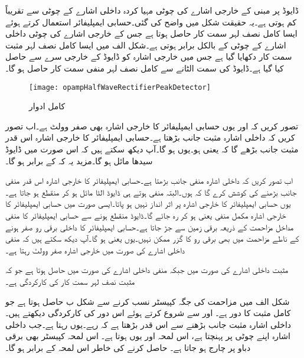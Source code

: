 ڈایوڈ پر مبنی  کے خارجی اشارے کی چوٹی مہیا کردہ داخلی اشارے کے چوٹی سے تقریباً  کم ہوتی ہے۔یہ حقیقت شکل  میں واضح کی گئی۔حسابی ایمپلیفائر استعمال کرتے ہوئے ایسا کامل نصف لہر سمت کار حاصل ہوتا ہے  جس کے خارجی اشارے کی چوٹی داخلی اشارے کے چوٹی کے بالکل برابر ہوتی ہے۔شکل الف میں ایسا کامل نصف لہر مثبت سمت کار دکھایا گیا ہے جس میں خارجی اشارہ  کو ڈایوڈ کے خارجی سرے سے حاصل کیا گیا ہے۔ڈایوڈ کی سمت الٹانے سے  کامل نصف لہر منفی سمت کار حاصل ہو گا۔
\begin{figure}
\centering
\texttt{[image: opampHalfWaveRectifierPeakDetector]}
\caption{کامل ادوار}
\label{شکل_کامل_نصف_لہر_سمت_کار}
\end{figure}

تصور کریں کہ  اور یوں حسابی ایمپلیفائر کا خارجی اشارہ  بھی صفر وولٹ ہے۔اب تصور کریں کہ داخلی اشارہ مثبت جانب بڑھتا ہے۔حسابی ایمپلیفائر کا خارجی اشارہ اس قدر مثبت جانب بڑھے گا کہ  یعنی  ہو۔یوں  ہو گا۔آپ دیکھ سکتے ہیں کہ اس صورت میں ڈایوڈ سیدھا مائل ہو گا۔مزید یہ کہ  کے برابر ہو گا۔

اب تصور کریں کہ داخلی اشارہ منفی جانب بڑھتا ہے۔حسابی ایمپلیفائر کا خارجی اشارہ  اس قدر منفی جانب بڑھنے کی کوشش کرے گا کہ  ہوں۔البتہ  منفی ہوتے ہی ڈایوڈ الٹا مائل ہو کر منقطع ہو جاتا ہے۔یوں حسابی ایمپلیفائر کا خارجی اشارہ  پر اثر انداز نہیں ہو پاتا۔ایسی صورت میں حسابی ایمپلیفائر کا خارجی اشارہ مکمل منفی یعنی  ہو کر رہ جائے گا۔ڈایوڈ منقطع ہونے سے  حسابی ایمپلیفائر کا منفی مداخل مزاحمت  کے ذریعہ برقی زمین سے جڑ جاتا ہے۔حسابی ایمپلیفائر کا داخلی برقی رو صفر ہونے کے ناطے مزاحمت میں بھی برقی رو  کا گزر ممکن نہیں۔یوں  یعنی  ہو گا۔آپ دیکھ سکتے ہیں کہ منفی داخلی اشارے کی صورت میں خارجی اشارہ صفر وولٹ رہتا ہے۔

مثبت داخلی اشارے کی صورت میں  جبکہ منفی داخلی اشارے کی صورت میں  حاصل ہوتا ہے جو کہ مثبت نصف لہر سمت کار کی کارکردگی ہے۔

شکل  الف میں مزاحمت کی جگہ کپیسٹر نسب کرنے سے شکل  ب حاصل ہوتا ہے جو کامل مثبت  کا دور ہے۔ اور  سے شروع کرتے ہوئے اس دور کی کارکردگی دیکھتے ہیں۔داخلی اشارہ مثبت جانب بڑھنے سے  اس قدر بڑھتا ہے کہ  رہے۔یوں  رہتا ہے۔جب داخلی اشارہ اپنے چوٹی  پر پہنچتا ہے، اس لمحہ  اور یوں  ہوتا ہے۔ اس لمحہ کپیسٹر بھی  برقی دباو پر چارج ہو جاتا ہے۔ حاصل کرنے کی خاطر اس لمحہ  کے برابر ہو گا۔

